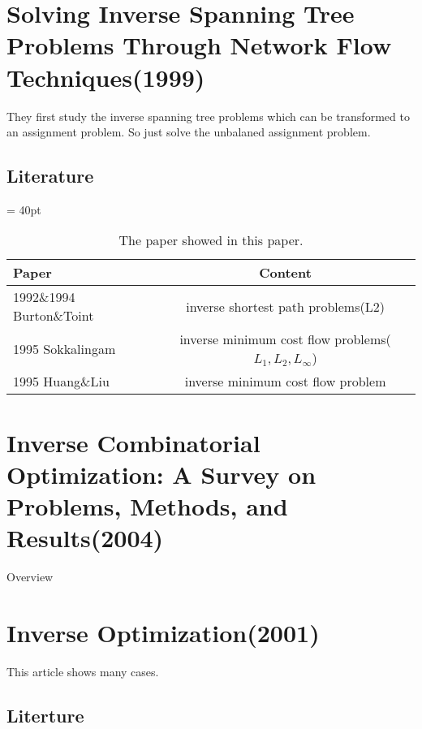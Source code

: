 \documentclass[UTF8]{article}
\begin{document}
\section{Solving Inverse Spanning Tree Problems Through Network Flow Techniques(1999)}

They ﬁrst study the inverse spanning tree problems which can be transformed to an assignment problem. So just solve the unbalaned assignment problem.


\subsection{Literature}


\begin{table}[ht]

\tabcolsep = 40pt

\small\renewcommand{}

\caption{The paper showed in this paper.\label{tab:2}}

{\begin{tabular}{lc}
\hline
Paper & Content \\
\hline
1992\&1994 Burton\&Toint & inverse shortest path problems(L2) \\
\hline
1995 Sokkalingam & inverse minimum cost flow problems($L_1,L_2,L_\infty $) \\
\hline
1995 Huang\&Liu & inverse minimum cost flow problem \\
\hline

\end{tabular}}
{}
\end{table}


\section{Inverse Combinatorial Optimization: A Survey on Problems, Methods, and Results(2004)}

Overview



\section{Inverse Optimization(2001)}

This article shows many cases.


\subsection{Literture}
\end{document}
